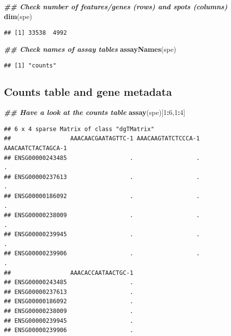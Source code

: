 \documentclass[
]{book}
\newenvironment{Shaded}{\begin{snugshade}}{\end{snugshade}}
\newcommand{\DecValTok}[1]{\textcolor[rgb]{0.00,0.00,0.81}{#1}}
\newcommand{\DocumentationTok}[1]{\textcolor[rgb]{0.56,0.35,0.01}{\textbf{\textit{#1}}}}
\newcommand{\FunctionTok}[1]{\textcolor[rgb]{0.13,0.29,0.53}{\textbf{#1}}}
\newcommand{\NormalTok}[1]{#1}
\newcommand{\SpecialCharTok}[1]{\textcolor[rgb]{0.81,0.36,0.00}{\textbf{#1}}}
\begin{document}
\begin{Shaded}
\begin{Highlighting}[]
\DocumentationTok{\#\# Check number of features/genes (rows) and spots (columns)}
\FunctionTok{dim}\NormalTok{(spe)}
\end{Highlighting}
\end{Shaded}

\begin{verbatim}
## [1] 33538  4992
\end{verbatim}

\begin{Shaded}
\begin{Highlighting}[]
\DocumentationTok{\#\# Check names of \textquotesingle{}assay\textquotesingle{} tables}
\FunctionTok{assayNames}\NormalTok{(spe)}
\end{Highlighting}
\end{Shaded}

\begin{verbatim}
## [1] "counts"
\end{verbatim}

\hypertarget{counts-table-and-gene-metadata}{%
\subsection{Counts table and gene metadata}\label{counts-table-and-gene-metadata}}

\begin{Shaded}
\begin{Highlighting}[]
\DocumentationTok{\#\# Have a look at the counts table}
\FunctionTok{assay}\NormalTok{(spe)[}\DecValTok{1}\SpecialCharTok{:}\DecValTok{6}\NormalTok{,}\DecValTok{1}\SpecialCharTok{:}\DecValTok{4}\NormalTok{]}
\end{Highlighting}
\end{Shaded}

\begin{verbatim}
## 6 x 4 sparse Matrix of class "dgTMatrix"
##                 AAACAACGAATAGTTC-1 AAACAAGTATCTCCCA-1 AAACAATCTACTAGCA-1
## ENSG00000243485                  .                  .                  .
## ENSG00000237613                  .                  .                  .
## ENSG00000186092                  .                  .                  .
## ENSG00000238009                  .                  .                  .
## ENSG00000239945                  .                  .                  .
## ENSG00000239906                  .                  .                  .
##                 AAACACCAATAACTGC-1
## ENSG00000243485                  .
## ENSG00000237613                  .
## ENSG00000186092                  .
## ENSG00000238009                  .
## ENSG00000239945                  .
## ENSG00000239906                  .
\end{verbatim}
\end{document}
